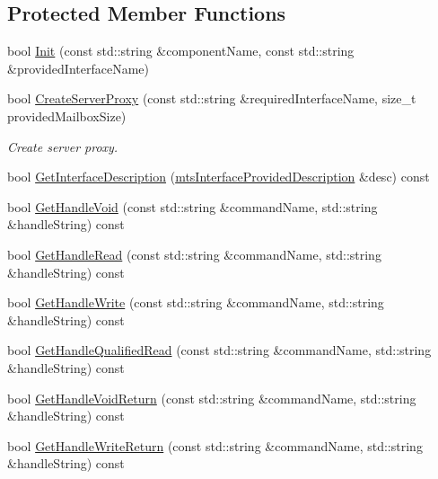 \subsection*{Protected Member Functions}
\begin{DoxyCompactItemize}
\item 
bool \hyperlink{classmts_socket_proxy_server_a484df52523d8ba237358a6cc56b8d67a}{Init} (const std\+::string \&component\+Name, const std\+::string \&provided\+Interface\+Name)
\item 
bool \hyperlink{classmts_socket_proxy_server_a8040ee220cf3249685932aad1cf52231}{Create\+Server\+Proxy} (const std\+::string \&required\+Interface\+Name, size\+\_\+t provided\+Mailbox\+Size)
\begin{DoxyCompactList}\small\item\em Create server proxy. \end{DoxyCompactList}\item 
bool \hyperlink{classmts_socket_proxy_server_aac2d100483f25d78682b8137546a8c25}{Get\+Interface\+Description} (\hyperlink{classmts_interface_provided_description}{mts\+Interface\+Provided\+Description} \&desc) const 
\item 
bool \hyperlink{classmts_socket_proxy_server_ab9a97e4761a5824bdb8cdd2b2f29b530}{Get\+Handle\+Void} (const std\+::string \&command\+Name, std\+::string \&handle\+String) const 
\item 
bool \hyperlink{classmts_socket_proxy_server_a33f70a2d493e886ecd92321928aeef9a}{Get\+Handle\+Read} (const std\+::string \&command\+Name, std\+::string \&handle\+String) const 
\item 
bool \hyperlink{classmts_socket_proxy_server_a44b7dcdd1649d6f8766fbc5eca76f07c}{Get\+Handle\+Write} (const std\+::string \&command\+Name, std\+::string \&handle\+String) const 
\item 
bool \hyperlink{classmts_socket_proxy_server_a9fc0e7143f33f086e8ed0e77946e294c}{Get\+Handle\+Qualified\+Read} (const std\+::string \&command\+Name, std\+::string \&handle\+String) const 
\item 
bool \hyperlink{classmts_socket_proxy_server_a432865d53e1346134ddcc41422b013f2}{Get\+Handle\+Void\+Return} (const std\+::string \&command\+Name, std\+::string \&handle\+String) const 
\item 
bool \hyperlink{classmts_socket_proxy_server_aa23bcc2804b23e7db80431e83caa3b3f}{Get\+Handle\+Write\+Return} (const std\+::string \&command\+Name, std\+::string \&handle\+String) const 
\item 

\end{DoxyCompactItemize}
